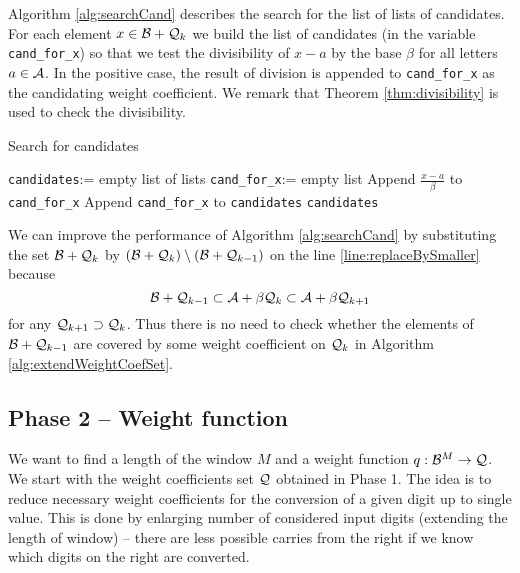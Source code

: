 Algorithm \ref{alg:searchCand} describes the search for the list of lists of candidates. For each element $x\in \mathcal{B} + \mathcal{Q}_{k}$ we build the list of candidates (in the variable \verb+cand_for_x+) so that we test the divisibility of $x-a$ by the base $\beta$ for all letters $a\in\mathcal{A}$. In the positive case, the result of division is appended to \verb+cand_for_x+ as the candidating weight coefficient. We remark that Theorem \ref{thm:divisibility} is used to check the divisibility.


\begin{algorithm}
  \caption{Search for candidates}
    \label{alg:searchCand}
  \begin{algorithmic}[1]
    \STATE \verb+candidates+:= empty list of lists
     \label{line:replaceBySmaller}
      \STATE \verb+cand_for_x+:= empty list
              \STATE Append $\frac{x-a}{\beta}$ to \verb+cand_for_x+
            \ENDIF
      \ENDFOR 
      \STATE Append \verb+cand_for_x+ to \verb+candidates+
  \ENDFOR
  \RETURN \verb+candidates+
  \end{algorithmic}
\end{algorithm}  

We can improve the performance of Algorithm \ref{alg:searchCand} by substituting the set $\mathcal{B} + \mathcal{Q}_{k}$ by $(\mathcal{B} + \mathcal{Q}_{k})\setminus (\mathcal{B} + \mathcal{Q}_{k-1})$ on the line \ref{line:replaceBySmaller} because
$$
\mathcal{B} + \mathcal{Q}_{k-1} \subset \mathcal{A} + \beta \mathcal{Q}_{k} \subset \mathcal{A} + \beta \mathcal{Q}_{k+1}
$$
for any $\mathcal{Q}_{k+1} \supset \mathcal{Q}_{k}$. Thus there is no need to check whether the elements of $\mathcal{B} + \mathcal{Q}_{k-1}$ are covered by some weight coefficient on $\mathcal{Q}_k$ in Algorithm \ref{alg:extendWeightCoefSet}.



    

  
    
    





\subsection{Phase 2 -- Weight function}
\label{subsec:phase2}
    We want to find a length of the window $M$ and a weight function $q:\mathcal{B}^{M} \to \mathcal{Q}$. We start with the weight coefficients set $\mathcal{Q}$ obtained in Phase 1. The idea is to reduce necessary weight coefficients for the conversion of a given digit up to single value. This is done by enlarging number of considered input digits (extending the length of window) -- there are less possible carries from the right if we know which digits on the right are converted. 
     
